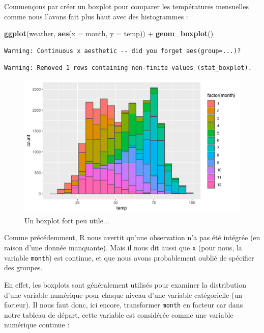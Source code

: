 \documentclass[
  a4paper,
]{article}
\newenvironment{Shaded}{\begin{snugshade}}{\end{snugshade}}
\newcommand{\DataTypeTok}[1]{\textcolor[rgb]{0.00,0.34,0.68}{#1}}
\newcommand{\KeywordTok}[1]{\textcolor[rgb]{0.12,0.11,0.11}{\textbf{#1}}}
\newcommand{\NormalTok}[1]{\textcolor[rgb]{0.12,0.11,0.11}{#1}}
\newcommand{\OperatorTok}[1]{\textcolor[rgb]{0.12,0.11,0.11}{#1}}
\newcommand{\StringTok}[1]{\textcolor[rgb]{0.75,0.01,0.01}{#1}}
\begin{document}
Commençons par créer un boxplot pour comparer les températures mensuelles comme nous l'avons fait plus haut avec des histogrammes :

\begin{Shaded}
\begin{Highlighting}[]
\KeywordTok{ggplot}\NormalTok{(weather, }\KeywordTok{aes}\NormalTok{(}\DataTypeTok{x =}\NormalTok{ month, }\DataTypeTok{y =}\NormalTok{ temp)) }\OperatorTok{+}
\StringTok{  }\KeywordTok{geom_boxplot}\NormalTok{()}
\end{Highlighting}
\end{Shaded}

\begin{verbatim}
Warning: Continuous x aesthetic -- did you forget aes(group=...)?
\end{verbatim}

\begin{verbatim}
Warning: Removed 1 rows containing non-finite values (stat_boxplot).
\end{verbatim}

\begin{figure}[htpb]

{\centering \includegraphics[width=0.9\linewidth]{figure/unnamed-chunk-53-1} 

}

\caption{Un boxplot fort peu utile...}\label{fig:unnamed-chunk-53}
\end{figure}

Comme précédemment, R nous avertit qu'une observation n'a pas été intégrée (en raison d'une donnée manquante). Mais il nous dit aussi que \texttt{x} (pour nous, la variable \texttt{month}) est continue, et que nous avons probablement oublié de spécifier des groupes.

En effet, les boxplots sont généralement utilisés pour examiner la distribution d'une variable numérique pour chaque niveau d'une variable catégorielle (un facteur). Il nous faut donc, ici encore, transformer \texttt{month} en facteur car dans notre tableau de départ, cette variable est considérée comme une variable numérique continue :
\end{document}
